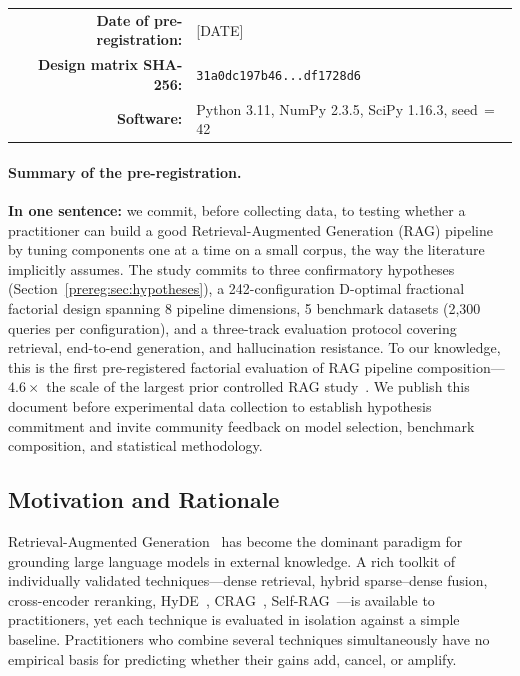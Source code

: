 \begin{center}
\begin{tabular}{@{}rl@{}}
  \textbf{Date of pre-registration:} & [DATE] \\
  \textbf{Design matrix SHA-256:}    & \texttt{31a0dc197b46...df1728d6} \\
  \textbf{Software:}                 & Python 3.11, NumPy 2.3.5, SciPy 1.16.3, seed\,$=$\,42 \\
\end{tabular}
\end{center}


\paragraph{Summary of the pre-registration.}
\textbf{In one sentence:} we commit, before collecting data, to
testing whether a practitioner can build a good Retrieval-Augmented
Generation (RAG) pipeline by tuning components one at a time on a
small corpus, the way the literature implicitly assumes.  The study
commits to three confirmatory hypotheses
(Section~\ref{prereg:sec:hypotheses}), a 242-configuration D-optimal
fractional factorial design spanning 8 pipeline dimensions, 5
benchmark datasets (2{,}300 queries per configuration), and a
three-track evaluation protocol covering retrieval, end-to-end
generation, and hallucination resistance.  To our knowledge, this is
the first pre-registered factorial evaluation of RAG pipeline
composition---$4.6\times$ the scale of the largest prior controlled
RAG study~\citep{jin2024flashrag}.  We publish this document before
experimental data collection to establish hypothesis commitment and
invite community feedback on model selection, benchmark composition,
and statistical methodology.
\subsection{Motivation and Rationale}

Retrieval-Augmented Generation~\citep{lewis2020rag} has become the
dominant paradigm for grounding large language models in external
knowledge.  A rich toolkit of individually validated
techniques---dense retrieval, hybrid sparse--dense fusion, cross-encoder
reranking, HyDE~\citep{gao2023hyde}, CRAG~\citep{yan2024crag},
Self-RAG~\citep{asai2023selfrag}---is available to practitioners, yet
each technique is evaluated in isolation against a simple baseline.
Practitioners who combine several techniques simultaneously have no
empirical basis for predicting whether their gains add, cancel, or
amplify.

